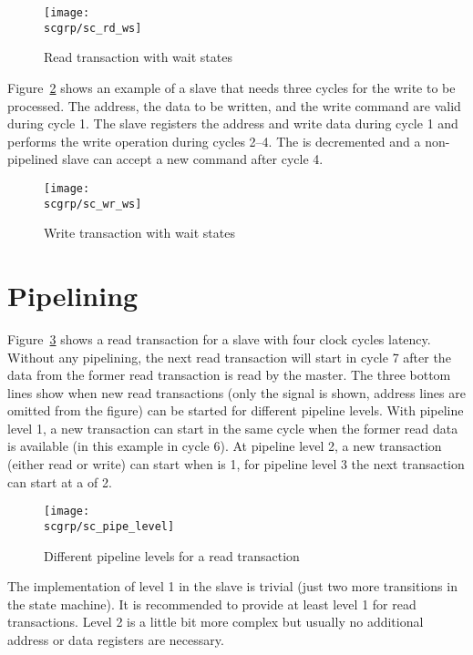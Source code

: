 \begin{figure}
    \centering
    \texttt{[image: \\scgrp/sc\_rd\_ws]}
    \caption{Read transaction with wait states}
    \label{fig:sc:rd:ws}
\end{figure}


Figure~\ref{fig:sc:wr:ws} shows an example of a slave that needs
three cycles for the write to be processed. The address, the data to
be written, and the write command are valid during cycle 1. The slave
registers the address and write data during cycle 1 and performs the
write operation during cycles 2--4. The  is
decremented and a non-pipelined slave can accept a new command after
cycle 4.

\begin{figure}
    \centering
    \texttt{[image: \\scgrp/sc\_wr\_ws]}
    \caption{Write transaction with wait states}
    \label{fig:sc:wr:ws}
\end{figure}



\section{Pipelining}

Figure~\ref{fig:sc:pipe:level} shows a read transaction for a slave
with four clock cycles latency. Without any pipelining, the next read
transaction will start in cycle 7 after the data from the former read
transaction is read by the master. The three bottom lines show when
new read transactions (only the  signal is shown, address
lines are omitted from the figure) can be started for different
pipeline levels. With pipeline level 1, a new transaction can start
in the same cycle when the former read data is available (in this
example in cycle 6). At pipeline level 2, a new transaction (either
read or write) can start when  is 1, for pipeline
level 3 the next transaction can start at a  of 2.

\begin{figure}
    \centering
    \texttt{[image: \\scgrp/sc\_pipe\_level]}
    \caption{Different pipeline levels for a read transaction}
    \label{fig:sc:pipe:level}
\end{figure}

The implementation of level 1 in the slave is trivial (just two more
transitions in the state machine). It is recommended to provide  at
least level 1 for read transactions. Level 2 is a little bit more
complex but usually no additional address or data registers are
necessary.

